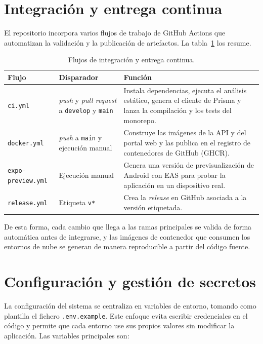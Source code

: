 \section{Integración y entrega continua}

El repositorio incorpora varios flujos de trabajo de GitHub Actions que automatizan la
validación y la publicación de artefactos. La tabla~\ref{tab:workflows_ci} los resume.

\begin{table}[H]
\centering
\caption{Flujos de integración y entrega continua.}
\label{tab:workflows_ci}
\small
\begin{tabularx}{\textwidth}{p{2.8cm} p{3.6cm} X}
\toprule
\textbf{Flujo} & \textbf{Disparador} & \textbf{Función} \\
\midrule
\texttt{ci.yml} & \textit{push} y \textit{pull request} a \texttt{develop} y
\texttt{main} & Instala dependencias, ejecuta el análisis estático, genera el cliente
de Prisma y lanza la compilación y los tests del monorepo. \\
\texttt{docker.yml} & \textit{push} a \texttt{main} y ejecución manual &
Construye las imágenes de la API y del portal web y las publica en el registro de
contenedores de GitHub (GHCR). \\
\texttt{expo-preview.yml} & Ejecución manual &
Genera una versión de previsualización de Android con EAS para probar la aplicación en
un dispositivo real. \\
\texttt{release.yml} & Etiqueta \texttt{v*} &
Crea la \textit{release} en GitHub asociada a la versión etiquetada. \\
\bottomrule
\end{tabularx}
\end{table}

De esta forma, cada cambio que llega a las ramas principales se valida de forma
automática antes de integrarse, y las imágenes de contenedor que consumen los entornos
de nube se generan de manera reproducible a partir del código fuente.

\section{Configuración y gestión de secretos}

La configuración del sistema se centraliza en variables de entorno, tomando como
plantilla el fichero \texttt{.env.example}. Este enfoque evita escribir credenciales en
el código y permite que cada entorno use sus propios valores sin modificar la
aplicación. Las variables principales son:

